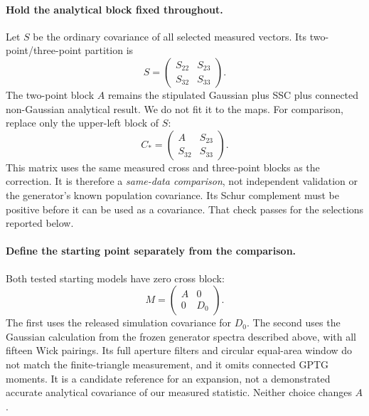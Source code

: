 \documentclass[11pt]{article}
\begin{document}
\paragraph{Hold the analytical block fixed throughout.}
Let $S$ be the ordinary covariance of all selected measured vectors.
Its two-point/three-point partition is
\begin{equation}
 S=\begin{pmatrix}S_{22}&S_{23}\\S_{32}&S_{33}\end{pmatrix}.
\end{equation}
The two-point block $A$ remains the stipulated Gaussian plus SSC plus
connected non-Gaussian analytical result. We do not fit it to the maps.
For comparison, replace only the upper-left block of $S$:
\begin{equation}
 C_* = \begin{pmatrix}A&S_{23}\\S_{32}&S_{33}\end{pmatrix}.
\end{equation}
This matrix uses the same measured cross and three-point blocks as the
correction. It is therefore a \emph{same-data comparison}, not independent
validation or the generator's known population covariance. Its Schur
complement must be positive before it can be used as a covariance. That
check passes for the selections reported below.

\paragraph{Define the starting point separately from the comparison.}
Both tested starting models have zero cross block:
\begin{equation}
 M=\begin{pmatrix}A&0\\0&D_0\end{pmatrix}.
\end{equation}
The first uses the released simulation covariance for $D_0$. The second
uses the Gaussian calculation from the frozen generator spectra described
above, with all fifteen Wick pairings. Its full aperture filters and
circular equal-area window do not match the finite-triangle measurement,
and it omits connected GPTG moments. It is a candidate reference for an
expansion, not a demonstrated accurate analytical covariance of our
measured statistic. Neither choice changes $A$.
\end{document}
